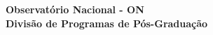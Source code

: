 \renewcommand{\imprimircapa}{%
  \begin{capa}%
    \center
    
    {\ABNTEXchapterfont\bfseries\Large Observatório Nacional - ON
      \\ Divisão de Programas de Pós-Graduação}
    

    \vspace*{1cm}
    {\ABNTEXchapterfont\large\imprimirautor}

    \vspace*{\fill}
    {\ABNTEXchapterfont\bfseries\LARGE\imprimirtitulo}
    \vspace*{\fill}
    
    {\large\imprimirlocal}
    
    {\large\imprimirdata}
    
    \vspace*{1cm}
  \end{capa}
}

\imprimircapa
